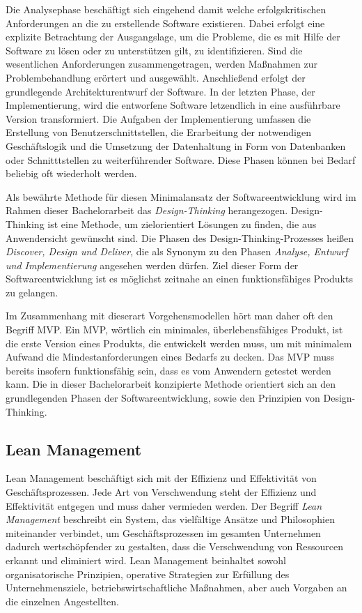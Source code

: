 Die Analysephase beschäftigt sich eingehend damit welche erfolgskritischen Anforderungen an die zu erstellende Software existieren. Dabei erfolgt eine explizite Betrachtung der Ausgangslage, um die Probleme, die es mit Hilfe der Software zu lösen oder zu unterstützen gilt, zu identifizieren. Sind die wesentlichen Anforderungen zusammengetragen, werden Maßnahmen zur Problembehandlung erörtert und ausgewählt. Anschließend erfolgt der grundlegende Architekturentwurf der Software. In der letzten Phase, der Implementierung, wird die entworfene Software letzendlich in eine ausführbare Version transformiert. Die Aufgaben der Implementierung umfassen die Erstellung von Benutzerschnittstellen, die Erarbeitung der notwendigen Geschäftslogik und die Umsetzung der Datenhaltung in Form von Datenbanken oder Schnitttstellen zu weiterführender Software. Diese Phasen können bei Bedarf beliebig oft wiederholt werden.
\cite{Krypczyk.2018}

Als bewährte Methode für diesen Minimalansatz der Softwareentwicklung wird im Rahmen dieser Bachelorarbeit das \textit{Design-Thinking} herangezogen. 
\cite{Elsner.2018}
Design-Thinking ist eine Methode, um zielorientiert Lösungen zu finden, die aus Anwendersicht gewünscht sind. Die Phasen des Design-Thinking-Prozesses heißen \textit{Discover, Design und Deliver}, die als Synonym zu den Phasen \textit{Analyse, Entwurf und Implementierung} angesehen werden dürfen. Ziel dieser Form der Softwareentwicklung ist es möglichst zeitnahe an einen funktionsfähiges Produkts zu gelangen.

Im Zusammenhang mit dieserart Vorgehensmodellen hört man daher oft den Begriff \ac{MVP}. Ein \ac{MVP}, wörtlich ein minimales, überlebensfähiges Produkt, ist die erste Version eines Produkts, die entwickelt werden muss, um mit minimalem Aufwand die Mindestanforderungen eines Bedarfs zu decken. Das \ac{MVP} muss bereits insofern funktionsfähig sein, dass es vom Anwendern getestet werden kann.
\cite{Elsner.2018}
Die in dieser Bachelorarbeit konzipierte Methode orientiert sich an den grundlegenden Phasen der Softwareentwicklung, sowie den Prinzipien von Design-Thinking. 

\subsection{Lean Management}

Lean Management beschäftigt sich mit der Effizienz und Effektivität von Geschäftsprozessen. Jede Art von Verschwendung steht der Effizienz und Effektivität entgegen und muss daher vermieden werden.
Der Begriff \textit{Lean Management} beschreibt ein System, das vielfältige Ansätze und Philosophien miteinander verbindet, um Geschäftsprozessen im gesamten Unternehmen dadurch wertschöpfender zu gestalten, dass die Verschwendung von Ressourcen erkannt und eliminiert wird.
Lean Management beinhaltet sowohl organisatorische Prinzipien, operative Strategien zur Erfüllung des Unternehmensziele, betriebswirtschaftliche Maßnahmen, aber auch Vorgaben an die einzelnen Angestellten.
\cite{Schell.2017}

